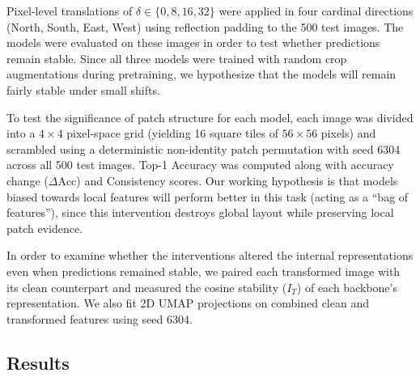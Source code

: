 \documentclass{article}
\begin{document}
Pixel-level translations of $\delta \in \{0, 8, 16, 32\}$ were applied in four cardinal directions (North, South, East, West) using reflection padding to the 500 test images. The models were evaluated on these images in order to test whether predictions remain stable. Since all three models were trained with random crop augmentations during pretraining, we hypothesize that the models will remain fairly stable under small shifts.

To test the significance of patch structure for each model, each image was divided into a $4 \times 4$ pixel-space grid (yielding 16 square tiles of $56 \times 56$ pixels) and scrambled using a deterministic non-identity patch permutation with seed 6304 across all 500 test images. Top-1 Accuracy was computed along with accuracy change ($\Delta \text{Acc}$) and Consistency scores. Our working hypothesis is that models biased towards local features will perform better in this task (acting as a ``bag of features''), since this intervention destroys global layout while preserving local patch evidence.

In order to examine whether the interventions altered the internal representations even when predictions remained stable, we paired each transformed image with its clean counterpart and measured the cosine stability ($I_T$) of each backbone's representation. We also fit 2D UMAP projections on combined clean and transformed features using seed 6304.

\subsection{Results}
\end{document}
